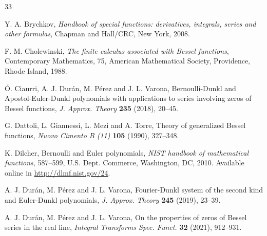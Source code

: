 \documentclass[12pt,leqno]{amsart}
\numberwithin{equation}{section}
\theoremstyle{plain}
\begin{document}
\begin{thebibliography}{33}



Y. A. Brychkov,
\textit{Handbook of special functions: derivatives, integrals, series and other formulas},
Chapman and Hall/CRC, New York, 2008.

F. M. Cholewinski,
\textit{The finite calculus associated with Bessel functions},
Contemporary Mathematics, 75,
American Mathematical Society, Providence, Rhode Island, 1988.

\'O. Ciaurri, A. J. Dur\'an, M. P\'erez and J. L. Varona,
{Bernoulli-Dunkl and Apostol-Euler-Dunkl polynomials with applications to series involving
zeros of Bessel functions},
\textit{J. Approx. Theory} \textbf{235} (2018), 20--45.

G. Dattoli, L. Giannessi, L. Mezi and A. Torre, 
Theory of generalized Bessel functions, 
\textit{Nuovo Cimento B (11)} %
\textbf{105}  (1990), 327--348.

K. Dilcher,
Bernoulli and Euler polynomials,
\textit{NIST handbook of mathematical functions},
587--599, %
U.S. Dept. Commerce, Washington, DC, 2010.
Available online in \url{http://dlmf.nist.gov/24}.

A. J. Dur\'an, M. P\'erez and J. L. Varona,
{Fourier-Dunkl system of the second kind and Euler-Dunkl polynomials},
\textit{J. Approx. Theory} \textbf{245} (2019), 23--39.

A. J. Dur\'an, M. P\'erez and J. L. Varona,
{On the properties of zeros of Bessel series in the real line},
\textit{Integral Transforms Spec. Funct.}
\textbf{32} (2021), 912--931. %


\end{thebibliography}
\end{document}
